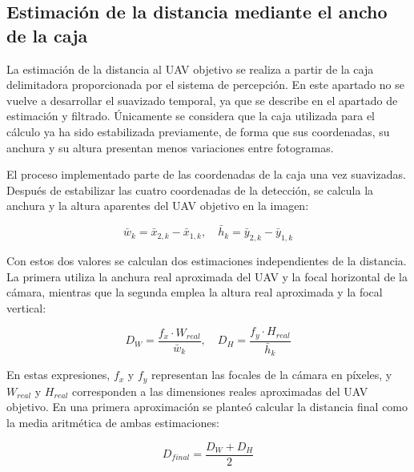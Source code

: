 \subsection{Estimación de la distancia mediante el ancho de la caja}

La estimación de la distancia al UAV objetivo se realiza a partir de la caja delimitadora proporcionada por el sistema de percepción. En este apartado no se vuelve a desarrollar el suavizado temporal, ya que se describe en el apartado de estimación y filtrado. Únicamente se considera que la caja utilizada para el cálculo ya ha sido estabilizada previamente, de forma que sus coordenadas, su anchura y su altura presentan menos variaciones entre fotogramas.

\vspace{0.3cm}

El proceso implementado parte de las coordenadas de la caja una vez suavizadas. Después de estabilizar las cuatro coordenadas de la detección, se calcula la anchura y la altura aparentes del UAV objetivo en la imagen:

\begin{equation}
\bar{w}_k = \bar{x}_{2,k} - \bar{x}_{1,k}, \quad
\bar{h}_k = \bar{y}_{2,k} - \bar{y}_{1,k}
\end{equation}

\vspace{0.3cm}

Con estos dos valores se calculan dos estimaciones independientes de la distancia. La primera utiliza la anchura real aproximada del UAV y la focal horizontal de la cámara, mientras que la segunda emplea la altura real aproximada y la focal vertical:

\begin{equation}
D_W = \frac{f_x \cdot W_{real}}{\bar{w}_k}, \quad
D_H = \frac{f_y \cdot H_{real}}{\bar{h}_k}
\end{equation}

\vspace{0.3cm}

En estas expresiones, $f_x$ y $f_y$ representan las focales de la cámara en píxeles, y $W_{real}$ y $H_{real}$ corresponden a las dimensiones reales aproximadas del UAV objetivo. En una primera aproximación se planteó calcular la distancia final como la media aritmética de ambas estimaciones:

\begin{equation}
D_{final} = \frac{D_W + D_H}{2}
\end{equation}

